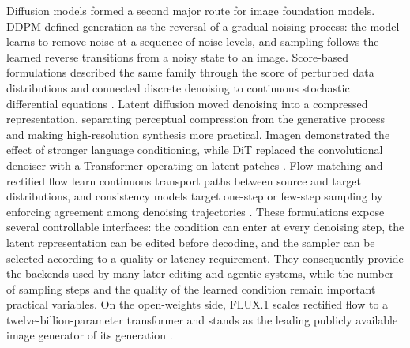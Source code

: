 Diffusion models formed a second major route for image foundation models. DDPM defined generation as the reversal of a gradual noising process: the model learns to remove noise at a sequence of noise levels, and sampling follows the learned reverse transitions from a noisy state to an image. Score-based formulations described the same family through the score of perturbed data distributions and connected discrete denoising to continuous stochastic differential equations \cite{ho2020ddpm,song2021scorebased}. Latent diffusion moved denoising into a compressed representation, separating perceptual compression from the generative process and making high-resolution synthesis more practical. Imagen demonstrated the effect of stronger language conditioning, while DiT replaced the convolutional denoiser with a Transformer operating on latent patches \cite{saharia2022imagen,rombach2022ldm,peebles2023dit}. Flow matching and rectified flow learn continuous transport paths between source and target distributions, and consistency models target one-step or few-step sampling by enforcing agreement among denoising trajectories \cite{lipman2022flowmatching,liu2022rectified,song2023consistency}. These formulations expose several controllable interfaces: the condition can enter at every denoising step, the latent representation can be edited before decoding, and the sampler can be selected according to a quality or latency requirement. They consequently provide the backends used by many later editing and agentic systems, while the number of sampling steps and the quality of the learned condition remain important practical variables. On the open-weights side, FLUX.1 scales rectified flow to a twelve-billion-parameter transformer and stands as the leading publicly available image generator of its generation \cite{blackforest2024flux}.

